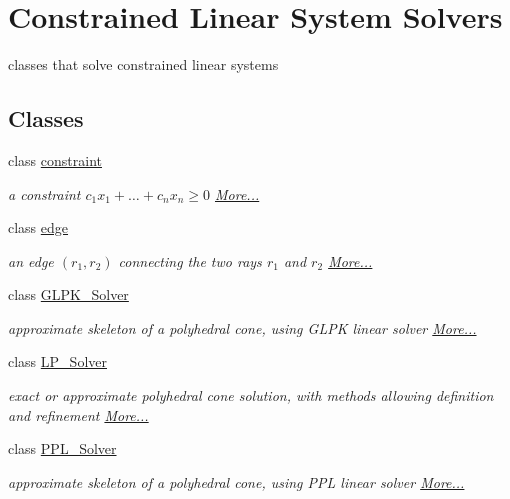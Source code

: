 \hypertarget{group___c_l_s_solvers}{}\section{Constrained Linear System Solvers}
\label{group___c_l_s_solvers}


classes that solve constrained linear systems  


\subsection*{Classes}
\begin{DoxyCompactItemize}
\item 
class \hyperlink{group___c_l_s_solvers_classconstraint}{constraint}
\begin{DoxyCompactList}\small\item\em a constraint $ c_1 x_1 + \ldots + c_n x_n \geq 0 $  \hyperlink{group___c_l_s_solvers_classconstraint}{More...}\end{DoxyCompactList}\item 
class \hyperlink{group___c_l_s_solvers_classedge}{edge}
\begin{DoxyCompactList}\small\item\em an edge $(r_1,r_2)$ connecting the two rays $ r_1 $ and $ r_2 $  \hyperlink{group___c_l_s_solvers_classedge}{More...}\end{DoxyCompactList}\item 
class \hyperlink{group___c_l_s_solvers_class_g_l_p_k___solver}{G\+L\+P\+K\+\_\+\+Solver}
\begin{DoxyCompactList}\small\item\em approximate skeleton of a polyhedral cone, using G\+L\+PK linear solver  \hyperlink{group___c_l_s_solvers_class_g_l_p_k___solver}{More...}\end{DoxyCompactList}\item 
class \hyperlink{group___c_l_s_solvers_class_l_p___solver}{L\+P\+\_\+\+Solver}
\begin{DoxyCompactList}\small\item\em exact or approximate polyhedral cone solution, with methods allowing definition and refinement  \hyperlink{group___c_l_s_solvers_class_l_p___solver}{More...}\end{DoxyCompactList}\item 
class \hyperlink{group___c_l_s_solvers_class_p_p_l___solver}{P\+P\+L\+\_\+\+Solver}
\begin{DoxyCompactList}\small\item\em approximate skeleton of a polyhedral cone, using P\+PL linear solver  \hyperlink{group___c_l_s_solvers_class_p_p_l___solver}{More...}\end{DoxyCompactList}\item 

\end{DoxyCompactItemize}
